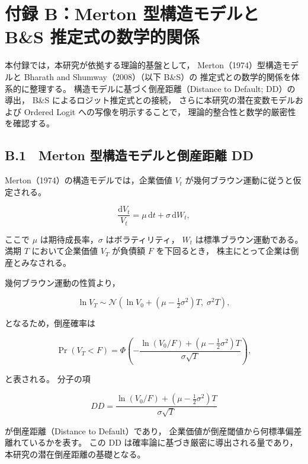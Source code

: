 \chapter*{付録 B：Merton 型構造モデルと B\&S 推定式の数学的関係}
\label{app:merton_bs}

本付録では，本研究が依拠する理論的基盤として，
Merton（1974）型構造モデルと Bharath and Shumway（2008）（以下 B\&S）の
推定式との数学的関係を体系的に整理する。
構造モデルに基づく倒産距離（Distance to Default; DD）の導出，
B\&S によるロジット推定式との接続，
さらに本研究の潜在変数モデルおよび Ordered Logit への写像を明示することで，
理論的整合性と数学的厳密性を確認する。

\section*{B.1　Merton 型構造モデルと倒産距離 DD}

Merton（1974）の構造モデルでは，企業価値 $V_t$ が幾何ブラウン運動に従うと仮定される。



\[
\frac{\mathrm{d}V_t}{V_t}
=
\mu\,\mathrm{d}t + \sigma\,\mathrm{d}W_t,
\]



ここで $\mu$ は期待成長率，$\sigma$ はボラティリティ，
$W_t$ は標準ブラウン運動である。
満期 $T$ において企業価値 $V_T$ が負債額 $F$ を下回るとき，
株主にとって企業は倒産とみなされる。

幾何ブラウン運動の性質より，



\[
\ln V_T
\sim
\mathcal{N}
\left(
\ln V_0 + (\mu - \tfrac{1}{2}\sigma^2)T,\;
\sigma^2 T
\right),
\]



となるため，倒産確率は



\[
\Pr(V_T < F)
=
\Phi\left(
-\frac{\ln(V_0/F) + (\mu - \tfrac{1}{2}\sigma^2)T}{\sigma\sqrt{T}}
\right),
\]



と表される。
分子の項



\[
DD
=
\frac{\ln(V_0/F) + (\mu - \tfrac{1}{2}\sigma^2)T}{\sigma\sqrt{T}}
\]



が倒産距離（Distance to Default）であり，
企業価値が倒産閾値から何標準偏差離れているかを表す。
この DD は確率論に基づき厳密に導出される量であり，
本研究の潜在倒産距離の基礎となる。


